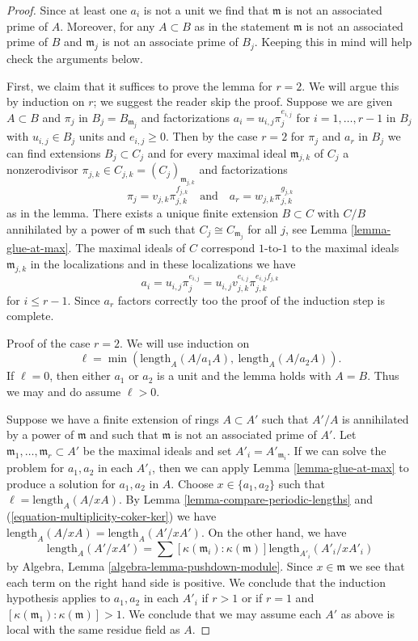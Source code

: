\begin{proof}
Since at least one $a_i$ is not a unit we find that $\mathfrak m$
is not an associated prime of $A$. Moreover, for any $A \subset B$
as in the statement $\mathfrak m$ is not an associated prime of $B$
and $\mathfrak m_j$ is not an associate prime of $B_j$.
Keeping this in mind will help check the arguments below.

\medskip\noindent
First, we claim that it suffices to prove the lemma for $r = 2$.
We will argue this by induction on $r$; we suggest the reader
skip the proof. Suppose we are given $A \subset B$ and $\pi_j$ in
$B_j = B_{\mathfrak m_j}$ and factorizations
$a_i = u_{i, j} \pi_j^{e_{i, j}}$ for $i = 1, \ldots, r - 1$ in $B_j$
with $u_{i, j} \in B_j$ units and $e_{i, j} \geq 0$.
Then by the case $r = 2$ for $\pi_j$ and $a_r$ in $B_j$
we can find extensions $B_j \subset C_j$ and for every maximal ideal
$\mathfrak m_{j, k}$ of $C_j$ a nonzerodivisor
$\pi_{j, k} \in C_{j, k} = (C_j)_{\mathfrak m_{j, k}}$
and factorizations
$$
\pi_j = v_{j, k} \pi_{j, k}^{f_{j, k}}
\quad\text{and}\quad
a_r = w_{j, k} \pi_{j, k}^{g_{j, k}}
$$
as in the lemma. There exists a unique finite extension $B \subset C$
with $C/B$ annihilated by a power of $\mathfrak m$ such
that $C_j \cong C_{\mathfrak m_j}$ for all $j$, see
Lemma \ref{lemma-glue-at-max}.
The maximal ideals of $C$ correspond $1$-to-$1$
to the maximal ideals $\mathfrak m_{j, k}$ in the localizations
and in these localizations we have
$$
a_i = u_{i, j} \pi_j^{e_{i, j}} =
u_{i, j} v_{j, k}^{e_{i, j}} \pi_{j, k}^{e_{i, j}f_{j, k}}
$$
for $i \leq r - 1$. Since $a_r$ factors correctly too the
proof of the induction step is complete.

\medskip\noindent
Proof of the case $r = 2$. We will use induction on
$$
\ell = \min(\text{length}_A(A/a_1A),\ \text{length}_A(A/a_2A)).
$$
If $\ell = 0$, then either $a_1$ or $a_2$ is a unit and
the lemma holds with $A = B$. Thus we may and do assume $\ell > 0$.

\medskip\noindent
Suppose we have a finite extension of rings $A \subset A'$ such that
$A'/A$ is annihilated by a power of $\mathfrak m$ and such that
$\mathfrak m$ is not an associated prime of $A'$.
Let $\mathfrak m_1, \ldots, \mathfrak m_r \subset A'$
be the maximal ideals and set $A'_i = A'_{\mathfrak m_i}$.
If we can solve the problem for $a_1, a_2$ in each $A'_i$,
then we can apply Lemma \ref{lemma-glue-at-max}
to produce a solution for $a_1, a_2$ in $A$.
Choose $x \in \{a_1, a_2\}$ such that $\ell = \text{length}_A(A/xA)$.
By Lemma \ref{lemma-compare-periodic-lengths} 
and (\ref{equation-multiplicity-coker-ker})
we have $\text{length}_A(A/xA) = \text{length}_A(A'/xA')$.
On the other hand, we have
$$
\text{length}_A(A'/xA') =
\sum [\kappa(\mathfrak m_i) : \kappa(\mathfrak m)]
\text{length}_{A'_i}(A'_i/xA'_i)
$$
by Algebra, Lemma \ref{algebra-lemma-pushdown-module}.
Since $x \in \mathfrak m$ we see that each term on the right hand side
is positive. We conclude that the induction hypothesis applies
to $a_1, a_2$ in each $A'_i$ if $r > 1$ or if $r = 1$ and
$[\kappa(\mathfrak m_1) : \kappa(\mathfrak m)] > 1$.
We conclude that we may assume each $A'$ as above is local with
the same residue field as $A$.


\end{proof}
